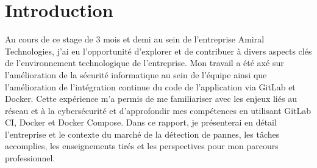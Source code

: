 \section{Introduction}
Au cours de ce stage de 3 mois et demi au sein de l'entreprise Amiral Technologies, j'ai eu l'opportunité d'explorer et de contribuer à divers aspects clés de l'environnement technologique de l'entreprise.
Mon travail a été axé sur l'amélioration de la sécurité informatique au sein de l'équipe ainsi que l'amélioration de l'intégration continue du code de l'application via GitLab et Docker.
Cette expérience m'a permis de me familiariser avec les enjeux liés au réseau et à la cybersécurité et d'approfondir mes compétences en utilisant GitLab CI, Docker et Docker Compose.
Dans ce rapport, je présenterai en détail l'entreprise et le contexte du marché de la détection de pannes, les tâches accomplies, les enseignements tirés et les perspectives pour mon parcours professionnel.
